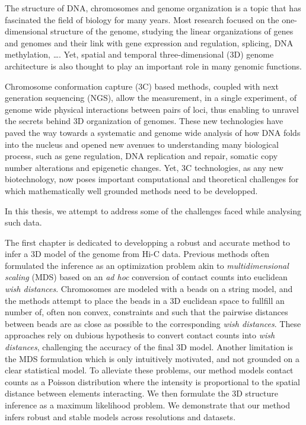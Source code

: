 


\begin{abstracts}        %

The structure of DNA, chromosomes and genome organization is a topic that has
fascinated the field of biology for many years. Most research focused on the
one-dimensional structure of the genome, studying the linear organizations of
genes and genomes and their link with gene expression and regulation,
splicing, DNA methylation, \dots. Yet, spatial and temporal three-dimensional
(3D) genome architecture is also thought to play an important role in many
genomic functions.

Chromosome conformation capture (3C) based methods, coupled with next
generation sequencing (NGS), allow the measurement, in a single experiment, of
genome wide physical interactions between pairs of loci, thus enabling to
unravel the secrets behind 3D organization of genomes. These new technologies
have paved the way towards a systematic and genome wide analysis of how DNA
folds into the nucleus and opened new avenues to understanding many biological
process, such as gene regulation, DNA replication and repair, somatic copy
number alterations and epigenetic changes. Yet, 3C technologies, as any new
biotechnology, now poses important computational and theoretical challenges
for which mathematically well grounded methods need to be developped.

In this thesis, we attempt to address some of the challenges faced while
analysing such data.

The first chapter is dedicated to developping a robust and accurate method to
infer a 3D model of the genome from Hi-C data. Previous methods often
formulated the inference as an optimization problem akin to {\em
multidimensional scaling } (MDS) based on an {\em ad hoc} conversion of
contact counts into euclidean {\em wish distances}. Chromosomes are modeled
with a beads on a string model, and the methods attempt to place the beads in
a 3D euclidean space to fullfill an number of, often non convex, constraints
and such that the pairwise distances between beads are as close as possible
to the corresponding {\em wish distances}. These approaches rely on dubious
hypothesis to convert contact counts into {\em wish distances}, challenging
the accuracy of the final 3D model. Another limitation is the MDS formulation
which is only intuitively motivated, and not grounded on a clear statistical
model. To alleviate these problems, our method models contact counts as a
Poisson distribution where the
intensity is proportional to the spatial distance between elements
interacting. We then formulate the 3D structure inference as a maximum
likelihood problem. We demonstrate that our method infers robust and stable
models across resolutions and datasets.


\end{abstracts}
